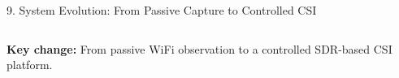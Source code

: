\documentclass[aspectratio=169,11pt,xcolor=table]{beamer}
\begin{document}
\begin{frame}{9. System Evolution: From Passive Capture to Controlled CSI}
\begin{columns}[T,totalwidth=\textwidth]

\end{columns}

\vspace{0.35cm}

\begin{center}
\textbf{\color{AmritaMaroon}Key change:}
From passive WiFi observation to a controlled SDR-based CSI platform.
\end{center}

\end{frame}


\end{document}
